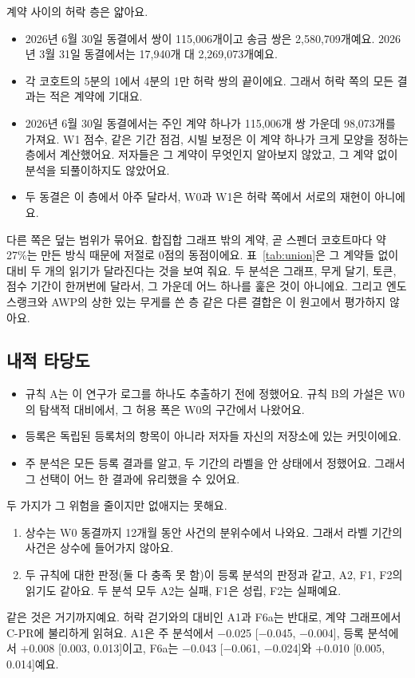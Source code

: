 계약 사이의 허락 층은 얇아요.
\begin{itemize}
\item 2026년 6월 30일 동결에서 쌍이 115,006개이고 송금 쌍은 2,580,709개예요. 2026년 3월 31일 동결에서는 17,940개 대 2,269,073개예요.
\item 각 코호트의 5분의 1에서 4분의 1만 허락 쌍의 끝이에요. 그래서 허락 쪽의 모든 결과는 적은 계약에 기대요.
\item 2026년 6월 30일 동결에서는 주인 계약 하나가 115,006개 쌍 가운데 98,073개를 가져요. W1 점수, 같은 기간 점검, 시빌 보정은 이 계약 하나가 크게 모양을 정하는 층에서 계산했어요. 저자들은 그 계약이 무엇인지 알아보지 않았고, 그 계약 없이 분석을 되풀이하지도 않았어요.
\item 두 동결은 이 층에서 아주 달라서, W0과 W1은 허락 쪽에서 서로의 재현이 아니에요.
\end{itemize}
다른 쪽은 덮는 범위가 묶어요. 합집합 그래프 밖의 계약, 곧 스펜더 코호트마다 약 27\%는 만든 방식 때문에 저절로 0점의 동점이에요. 표~\ref{tab:union}은 그 계약들 없이 대비 두 개의 읽기가 달라진다는 것을 보여 줘요. 두 분석은 그래프, 무게 달기, 토큰, 점수 기간이 한꺼번에 달라서, 그 가운데 어느 하나를 훑은 것이 아니에요. 그리고 엔도스랭크와 AWP의 상한 있는 무게를 쓴 층 같은 다른 결합은 이 원고에서 평가하지 않아요.

\subsection{내적 타당도}

\begin{itemize}
\item 규칙 A는 이 연구가 로그를 하나도 추출하기 전에 정했어요. 규칙 B의 가설은 W0의 탐색적 대비에서, 그 허용 폭은 W0의 구간에서 나왔어요.
\item 등록은 독립된 등록처의 항목이 아니라 저자들 자신의 저장소에 있는 커밋이에요.
\item 주 분석은 모든 등록 결과를 알고, 두 기간의 라벨을 안 상태에서 정했어요. 그래서 그 선택이 어느 한 결과에 유리했을 수 있어요.
\end{itemize}
두 가지가 그 위험을 줄이지만 없애지는 못해요.
\begin{enumerate}
\item 상수는 W0 동결까지 12개월 동안 사건의 분위수에서 나와요. 그래서 라벨 기간의 사건은 상수에 들어가지 않아요.
\item 두 규칙에 대한 판정(둘 다 충족 못 함)이 등록 분석의 판정과 같고, A2, F1, F2의 읽기도 같아요. 두 분석 모두 A2는 실패, F1은 성립, F2는 실패예요.
\end{enumerate}
같은 것은 거기까지예요. 허락 걷기와의 대비인 A1과 F6a는 반대로, 계약 그래프에서 C-PR에 불리하게 읽혀요. A1은 주 분석에서 −0.025 [−0.045, −0.004], 등록 분석에서 +0.008 [0.003, 0.013]이고, F6a는 −0.043 [−0.061, −0.024]와 +0.010 [0.005, 0.014]예요.

